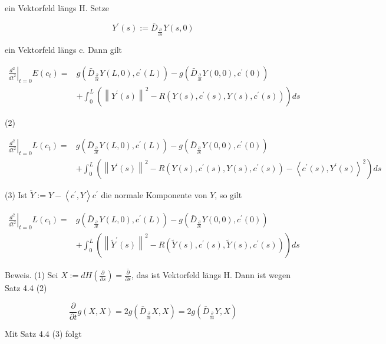 \documentclass[10pt]{article}
\begin{document}
ein Vektorfeld längs H. Setze

$$
Y^{\prime}(s):=\bar{D}_{\frac{\partial}{\partial s}} Y(s, 0)
$$

ein Vektorfeld längs c. Dann gilt


\begin{align*}
\left.\frac{d^{2}}{d t^{2}}\right|_{t=0} E\left(c_{t}\right)= & g\left(\bar{D}_{\frac{\partial}{\partial t}} Y(L, 0), c^{\prime}(L)\right)-g\left(\bar{D}_{\frac{\partial}{\partial t}} Y(0,0), c^{\prime}(0)\right)  \tag{1}\\
& +\int_{0}^{L}\left(\left\|Y^{\prime}(s)\right\|^{2}-R\left(Y(s), c^{\prime}(s), Y(s), c^{\prime}(s)\right)\right) d s
\end{align*}


(2)

$$
\begin{aligned}
\left.\frac{d^{2}}{d t^{2}}\right|_{t=0} L\left(c_{t}\right)= & g\left(\bar{D}_{\frac{\partial}{\partial t}} Y(L, 0), c^{\prime}(L)\right)-g\left(\bar{D}_{\frac{\partial}{\partial t}} Y(0,0), c^{\prime}(0)\right) \\
& +\int_{0}^{L}\left(\left\|Y^{\prime}(s)\right\|^{2}-R\left(Y(s), c^{\prime}(s), Y(s), c^{\prime}(s)\right)-\left\langle c^{\prime}(s), Y^{\prime}(s)\right\rangle^{2}\right) d s
\end{aligned}
$$

(3) Ist $\tilde{Y}:=Y-\left\langle c^{\prime}, Y\right\rangle c^{\prime}$ die normale Komponente von $Y$, so gilt

$$
\begin{aligned}
\left.\frac{d^{2}}{d t^{2}}\right|_{t=0} L\left(c_{t}\right)= & g\left(\bar{D}_{\frac{\partial}{\partial t}} Y(L, 0), c^{\prime}(L)\right)-g\left(\bar{D}_{\frac{\partial}{\partial t}} Y(0,0), c^{\prime}(0)\right) \\
& +\int_{0}^{L}\left(\left\|\tilde{Y}^{\prime}(s)\right\|^{2}-R\left(\tilde{Y}(s), c^{\prime}(s), \tilde{Y}(s), c^{\prime}(s)\right)\right) d s
\end{aligned}
$$

Beweis. (1) Sei $X:=d H\left(\frac{\partial}{\partial s}\right)=\overline{\frac{\partial}{\partial s}}$, das ist Vektorfeld längs H. Dann ist wegen Satz 4.4 (2)

$$
\frac{\partial}{\partial t} g(X, X)=2 g\left(\bar{D}_{\frac{\partial}{\partial t}} X, X\right)=2 g\left(\bar{D}_{\frac{\partial}{\partial s}} Y, X\right)
$$

Mit Satz 4.4 (3) folgt
\end{document}
